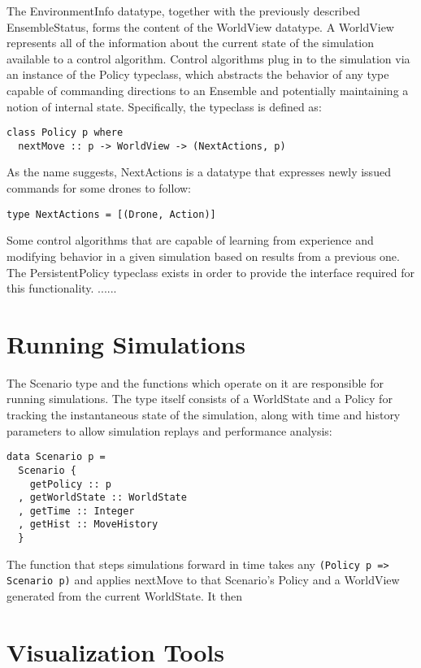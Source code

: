 The EnvironmentInfo datatype, together with the previously described EnsembleStatus, forms the content of the WorldView datatype. A WorldView represents all of the information about the current state of the simulation available to a control algorithm. Control algorithms plug in to the simulation via an instance of the Policy typeclass, which abstracts the behavior of any type capable of commanding directions to an Ensemble and potentially maintaining a notion of internal state. Specifically, the typeclass is defined as:

\begin{verbatim}
class Policy p where
  nextMove :: p -> WorldView -> (NextActions, p)
\end{verbatim}

As the name suggests, NextActions is a datatype that expresses newly issued commands for some drones to follow:

\begin{verbatim}
type NextActions = [(Drone, Action)]
\end{verbatim}

Some control algorithms that are capable of learning from experience and modifying behavior in a given simulation based on results from a previous one. The PersistentPolicy typeclass exists in order to provide the interface required for this functionality. ...... 

\section{Running Simulations}

The Scenario type and the functions which operate on it are responsible for running simulations. The type itself consists of a WorldState and a Policy for tracking the instantaneous state of the simulation, along with time and history parameters to allow simulation replays and performance analysis:

\begin{verbatim}
data Scenario p =
  Scenario {
    getPolicy :: p
  , getWorldState :: WorldState
  , getTime :: Integer
  , getHist :: MoveHistory
  }
\end{verbatim}

The function that steps simulations forward in time takes any \verb|(Policy p => Scenario p)| and applies nextMove to that Scenario's Policy and a WorldView generated from the current WorldState. It then 

\section{Visualization Tools}

